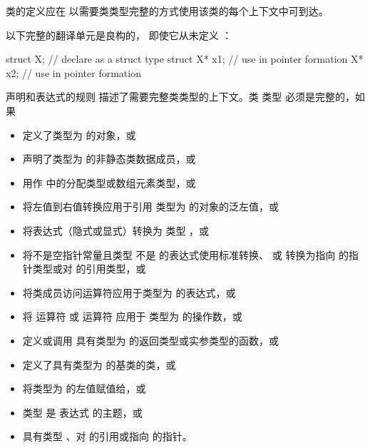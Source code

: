 \pnum
{}%
类的定义应在
以需要类类型完整的方式使用该类的每个上下文中可到达。
\begin{example}
以下完整的翻译单元是良构的，
即使它从未定义 ：
\begin{codeblock}
struct X;                       // declare  as a struct type
struct X* x1;                   // use  in pointer formation
X* x2;                          // use  in pointer formation
\end{codeblock}
\end{example}
\begin{note}
声明和表达式的规则
描述了需要完整类类型的上下文。类
类型  必须是完整的，如果
\begin{itemize}
\item 定义了类型为  的对象，或
\item 声明了类型为  的非静态类数据成员，或
\item {} 用作  中的分配类型或数组元素类型，或
\item 将左值到右值转换应用于引用
类型为  的对象的泛左值，或
\item 将表达式（隐式或显式）转换为
类型 ，或
\item 将不是空指针常量且类型
不是 \cv{}  的表达式使用标准转换、
 或
 转换为指向  的指针类型或对  的引用类型，或
\item 将类成员访问运算符应用于类型为
 的表达式，或
\item 将  运算符 或  运算符 应用于
类型为  的操作数，或
\item 定义或调用 具有类型为  的返回类型或实参类型的函数，或
\item 定义了具有类型为  的基类的类，或
\item 将类型为  的左值赋值给，或
\item 类型  是
 表达式 的主题，或
\item {} 具有类型 、对
 的引用或指向  的指针。
\end{itemize}
\end{note}

